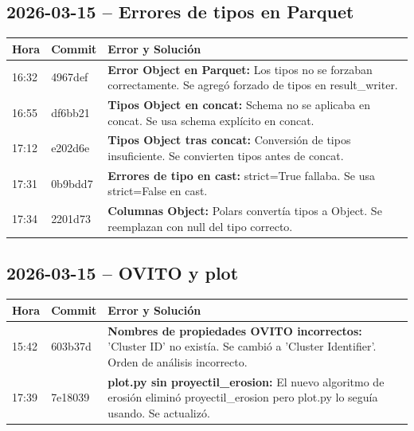 \documentclass[12pt,a4paper]{article}
\begin{document}
\subsection*{2026-03-15 -- Errores de tipos en Parquet}

\begin{table}[H]
	\centering
	\begin{tabular}{@{}llp{9cm}@{}}
		\toprule
		\textbf{Hora} & \textbf{Commit} & \textbf{Error y Solución}                                                                                               \\
		\midrule
		16:32         & 4967def         & \textbf{Error Object en Parquet:} Los tipos no se forzaban correctamente. Se agregó forzado de tipos en result\_writer. \\
		16:55         & df6bb21         & \textbf{Tipos Object en concat:} Schema no se aplicaba en concat. Se usa schema explícito en concat.                    \\
		17:12         & e202d6e         & \textbf{Tipos Object tras concat:} Conversión de tipos insuficiente. Se convierten tipos antes de concat.               \\
		17:31         & 0b9bdd7         & \textbf{Errores de tipo en cast:} strict=True fallaba. Se usa strict=False en cast.                                     \\
		17:34         & 2201d73         & \textbf{Columnas Object:} Polars convertía tipos a Object. Se reemplazan con null del tipo correcto.                    \\
		\bottomrule
	\end{tabular}
\end{table}

\subsection*{2026-03-15 -- OVITO y plot}

\begin{table}[H]
	\centering
	\begin{tabular}{@{}llp{9cm}@{}}
		\toprule
		\textbf{Hora} & \textbf{Commit} & \textbf{Error y Solución}                                                                                                                      \\
		\midrule
		15:42         & 603b37d         & \textbf{Nombres de propiedades OVITO incorrectos:} 'Cluster ID' no existía. Se cambió a 'Cluster Identifier'. Orden de análisis incorrecto.    \\
		17:39         & 7e18039         & \textbf{plot.py sin proyectil\_erosion:} El nuevo algoritmo de erosión eliminó proyectil\_erosion pero plot.py lo seguía usando. Se actualizó. \\
		\bottomrule
	\end{tabular}
\end{table}
\end{document}
